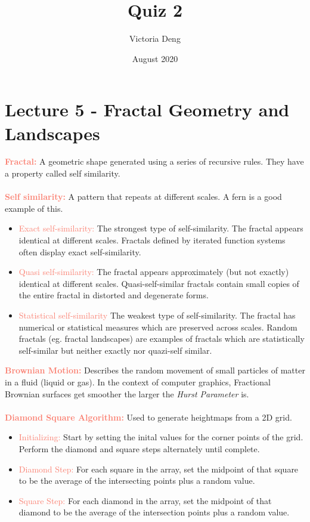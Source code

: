 \documentclass[a4paper,10pt]{article}
\title{Quiz 2}
\author {Victoria Deng}
\date{\small August 2020}
\begin{document}
\maketitle

\section*{Lecture 5 - Fractal Geometry and Landscapes}
\textcolor{Salmon}{\textbf{Fractal:}} A geometric shape generated using a series of recursive rules. They have a property called self similarity.\\ \\
\textcolor{Salmon}{\textbf{Self similarity:}} A pattern that repeats at different scales. A fern is a good example of this.
\renewcommand{\labelitemi}{\textperiodcentered}
\begin{itemize}
\item \textcolor{Salmon}{Exact self-similarity:} The strongest type of self-similarity. The fractal appears identical at different scales. Fractals defined by iterated function systems often display exact self-similarity. 
\item \textcolor{Salmon}{Quasi self-similarity:} The fractal appears approximately (but not exactly) identical at different scales. Quasi-self-similar fractals contain small copies of the entire fractal in distorted and degenerate forms.
\item \textcolor{Salmon}{Statistical self-similarity} The weakest type of self-similarity. The fractal has numerical or statistical measures which are preserved across scales. Random fractals (eg. fractal landscapes) are examples of fractals which are statistically self-similar but neither exactly nor quazi-self similar.
\end{itemize} 
\textcolor{Salmon}{\textbf{Brownian Motion:}} Describes the random movement of small particles of matter in a fluid (liquid or gas). In the context of computer graphics, Fractional Brownian surfaces get smoother the larger the \emph{Hurst Parameter} is. \\ \\
\textcolor{Salmon}{\textbf{Diamond Square Algorithm:}} Used to generate heightmaps from a 2D grid.
\renewcommand{\labelitemi}{\textperiodcentered}
\begin{itemize}
\item \textcolor{Salmon}{Initializing:} Start by setting the inital values for the corner points of the grid. Perform the diamond and square steps alternately until complete.
\item \textcolor{Salmon}{Diamond Step:} For each square in the array, set the midpoint of that square to be the average of the intersecting points plus a random value.
\item \textcolor{Salmon}{Square Step:} For each diamond in the array, set the midpoint of that diamond to be the average of the intersection points plus a random value. 
\end{itemize}
\end{document}
